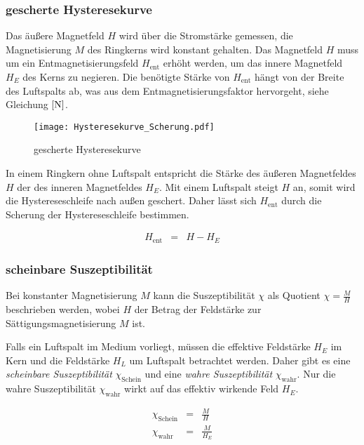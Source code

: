 \documentclass[12pt,a4paper]{scrartcl}
\numberwithin{equation}{section} %
\renewcommand{\[}{} %
\renewcommand{\]}{\noindent} %
\begin{document}
\hypertarget{gescherte-hysteresekurve}{%
\subsubsection{gescherte
Hysteresekurve}\label{gescherte-hysteresekurve}}

Das äußere Magnetfeld \(H\) wird über die Stromstärke gemessen, die
Magnetisierung \(M\) des Ringkerns wird konstant gehalten. Das
Magnetfeld \(H\) muss um ein Entmagnetisierungsfeld \(H_\mathrm{ent}\)
erhöht werden, um das innere Magnetfeld \(H_E\) des Kerns zu negieren.
Die benötigte Stärke von \(H_\mathrm{ent}\) hängt von der Breite des
Luftspalts ab, was aus dem Entmagnetisierungsfaktor hervorgeht, siehe
Gleichung \(\eqref{N}\).

\begin{figure}
\centering
\texttt{[image: Hysteresekurve\_Scherung.pdf]}
\caption{gescherte Hysteresekurve}
\end{figure}

In einem Ringkern ohne Luftspalt entspricht die Stärke des äußeren
Magnetfeldes \(H\) der des inneren Magnetfeldes \(H_E\). Mit einem
Luftspalt steigt \(H\) an, somit wird die Hystereseschleife nach außen
geschert. Daher lässt sich \(H_\mathrm{ent}\) durch die Scherung der
Hystereseschleife bestimmen.

\[
\begin{eqnarray}
    H_\mathrm{ent} &=& H - H_E \label{Hscher}
\end{eqnarray}
\]

\hypertarget{scheinbare-suszeptibilituxe4t}{%
\subsubsection{scheinbare
Suszeptibilität}\label{scheinbare-suszeptibilituxe4t}}

Bei konstanter Magnetisierung \(M\) kann die Suszeptibilität \(\chi\)
als Quotient \(\chi = \frac{M}{H}\) beschrieben werden, wobei \(H\) der
Betrag der Feldstärke zur Sättigungsmagnetisierung \(M\) ist.

Falls ein Luftspalt im Medium vorliegt, müssen die effektive Feldstärke
\(H_E\) im Kern und die Feldstärke \(H_L\) um Luftspalt betrachtet
werden. Daher gibt es eine \emph{scheinbare Suszeptibilität}
\(\chi_\mathrm{Schein}\) und eine \emph{wahre Suszeptibilität}
\(\chi_\mathrm{wahr}\). Nur die wahre Suszeptibilität
\(\chi_\mathrm{wahr}\) wirkt auf das effektiv wirkende Feld \(H_E\).

\[
\begin{eqnarray}
    \chi_\mathrm{Schein} &=& \frac{M}{H} \\
    \chi_\mathrm{wahr} &=& \frac{M}{H_E}
\end{eqnarray}
\]
\end{document}
